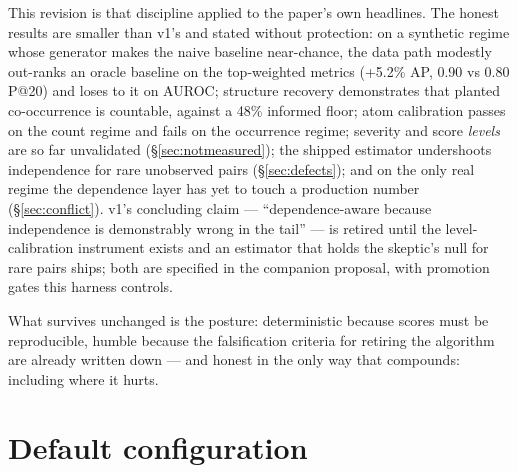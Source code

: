 \documentclass[11pt]{article}
\begin{document}
This revision is that discipline applied to the paper's own headlines. The
honest results are smaller than v1's and stated without protection: on a
synthetic regime whose generator makes the naive baseline near-chance, the
data path modestly out-ranks an oracle baseline on the top-weighted metrics
(+5.2\% AP, 0.90 vs 0.80 P@20) and loses to it on AUROC; structure recovery
demonstrates that planted co-occurrence is countable, against a 48\%
informed floor; atom calibration passes on the count regime and fails on the
occurrence regime; severity and score \emph{levels} are so far unvalidated
(\S\ref{sec:notmeasured}); the shipped estimator undershoots independence
for rare unobserved pairs (\S\ref{sec:defects}); and on the only real regime
the dependence layer has yet to touch a production number
(\S\ref{sec:conflict}). v1's concluding claim --- ``dependence-aware because
independence is demonstrably wrong in the tail'' --- is retired until the
level-calibration instrument exists and an estimator that holds the
skeptic's null for rare pairs ships; both are specified in the companion
proposal, with promotion gates this harness controls.

What survives unchanged is the posture: deterministic because scores must be
reproducible, humble because the falsification criteria for retiring the
algorithm are already written down --- and honest in the only way that
compounds: including where it hurts.

\clearpage
\appendix

\section{Default configuration}
\label{app:config}
\end{document}

